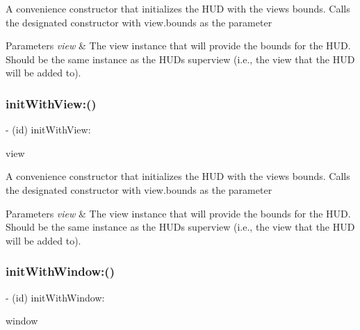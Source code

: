 A convenience constructor that initializes the H\+UD with the view\textquotesingle{}s bounds. Calls the designated constructor with view.\+bounds as the parameter


\begin{DoxyParams}{Parameters}
{\em view} & The view instance that will provide the bounds for the H\+UD. Should be the same instance as the H\+UD\textquotesingle{}s superview (i.\+e., the view that the H\+UD will be added to). \\
\hline
\end{DoxyParams}
\mbox{\label{interface_m_b_progress_h_u_d_ae42ee0d2d0ea58fac1ce8de6b5ea3b60}} 
\subsubsection{\texorpdfstring{init\+With\+View\+:()}{initWithView:()}\hspace{0.1cm}{\footnotesize\ttfamily [3/3]}}
{\footnotesize\ttfamily -\/ (id) init\+With\+View\+: \begin{DoxyParamCaption}\item[{(U\+I\+View $\ast$)}]{view }\end{DoxyParamCaption}}

A convenience constructor that initializes the H\+UD with the view\textquotesingle{}s bounds. Calls the designated constructor with view.\+bounds as the parameter


\begin{DoxyParams}{Parameters}
{\em view} & The view instance that will provide the bounds for the H\+UD. Should be the same instance as the H\+UD\textquotesingle{}s superview (i.\+e., the view that the H\+UD will be added to). \\
\hline
\end{DoxyParams}
\mbox{\label{interface_m_b_progress_h_u_d_a8f3c01167d59153c85ae7efdca7717fc}} 
\subsubsection{\texorpdfstring{init\+With\+Window\+:()}{initWithWindow:()}\hspace{0.1cm}{\footnotesize\ttfamily [1/3]}}
{\footnotesize\ttfamily -\/ (id) init\+With\+Window\+: \begin{DoxyParamCaption}\item[{(U\+I\+Window $\ast$)}]{window }\end{DoxyParamCaption}}

